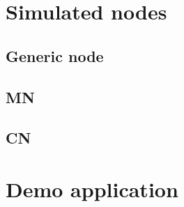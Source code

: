 \section{Simulated nodes}
\label{sec:porting_nodes}

\subsection{Generic node}
\label{sec:porting_nodes_generic}

\subsection{MN}
\label{sec:porting_nodes_mn}

\subsection{CN}
\label{sec:porting_nodes_cn}

\section{Demo application}
\label{sec:porting_demo}

%
%
%
%
%

